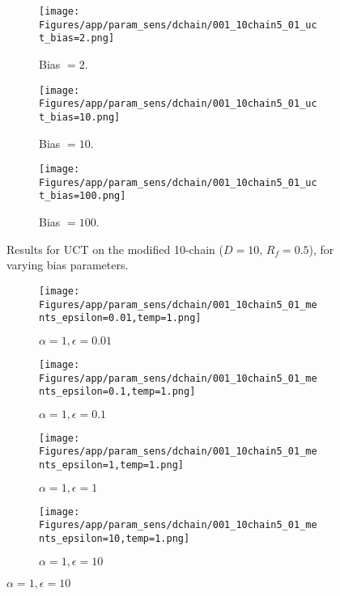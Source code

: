 \documentclass{article}
\theoremstyle{plain}
\begin{document}
\begin{appendices}
\begin{figure}
                \begin{subfigure}[b]{0.32\textwidth}
                    \centering
                    \texttt{[image: Figures/app/param\_sens/dchain/001\_10chain5\_01\_uct\_bias=2.png]}
                    \caption*{Bias $=2$.}
                \end{subfigure}
                \begin{subfigure}[b]{0.32\textwidth}
                    \centering
                    \texttt{[image: Figures/app/param\_sens/dchain/001\_10chain5\_01\_uct\_bias=10.png]}
                    \caption*{Bias $=10$.}
                \end{subfigure}
                \begin{subfigure}[b]{0.32\textwidth}
                    \centering
                    \texttt{[image: Figures/app/param\_sens/dchain/001\_10chain5\_01\_uct\_bias=100.png]}
                    \caption*{Bias $=100$.}
                \end{subfigure}
                
                \caption{Results for UCT on the modified 10-chain ($D=10$, $R_f=0.5$), for varying bias parameters.}
                \label{fig:uct_10chain_half_hps}
            \end{figure}


            \begin{figure}
                \centering
                
                \begin{subfigure}[b]{0.24\textwidth}
                    \centering
                    \texttt{[image: Figures/app/param\_sens/dchain/001\_10chain5\_01\_ments\_epsilon=0.01,temp=1.png]}
                    \caption*{$\alpha=1,\epsilon=0.01$}
                \end{subfigure}
                \begin{subfigure}[b]{0.24\textwidth}
                    \centering
                    \texttt{[image: Figures/app/param\_sens/dchain/001\_10chain5\_01\_ments\_epsilon=0.1,temp=1.png]}
                    \caption*{$\alpha=1,\epsilon=0.1$}
                \end{subfigure}
                \begin{subfigure}[b]{0.24\textwidth}
                    \centering
                    \texttt{[image: Figures/app/param\_sens/dchain/001\_10chain5\_01\_ments\_epsilon=1,temp=1.png]}
                    \caption*{$\alpha=1,\epsilon=1$}
                \end{subfigure}
                \begin{subfigure}[b]{0.24\textwidth}
                    \centering
                    \texttt{[image: Figures/app/param\_sens/dchain/001\_10chain5\_01\_ments\_epsilon=10,temp=1.png]}
                    \caption*{$\alpha=1,\epsilon=10$}
                \end{subfigure}
                

\end{figure}
\end{appendices}
\end{document}
